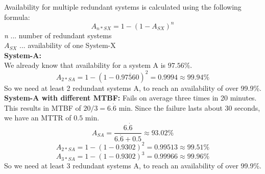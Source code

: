\documentclass{article}
\begin{document}
    Availability for multiple redundant systems is calculated using the following formula:\\
    \begin{equation}
      A_{n*SX} = 1 - (1 - A_{SX})^{n}
    \end{equation}
    \textit{n} ... number of redundant systems\\
    $A_{SX}$ ... availability of one System-X\\
    \newline
    \textbf{System-A:}\\
    We already know that availability for a system A is $97.56 \%$.\\
    \[ A_{2*SA} = 1 - (1 - 0.\overline{97560})^{2} = 0.9994 \approx 99.94 \% \]
    So we need at least 2 redundant systems A, to reach an availability of over 99.9\%.\\
    \newline
    \textbf{System-A with different MTBF:}
    Fails on average three times in 20 minutes. This results in MTBF of $20/3 = 6.\dot{6}$ min. Since the failure lasts about 30 seconds, we have an MTTR of $0.5$ min.\\
    \[ A_{SA} = \frac{6.\dot{6}}{6.\dot{6}+0.5} \approx 93.02 \% \]
    \[ A_{2*SA} = 1 - (1 - 0.9302)^{2} = 0.99513 \approx 99.51 \% \]
    \[ A_{3*SA} = 1 - (1 - 0.9302)^{3} = 0.99966 \approx 99.96 \% \]
    So we need at least 3 redundant systems A, to reach an availability of over 99.9\%.\\
  
\end{document}
